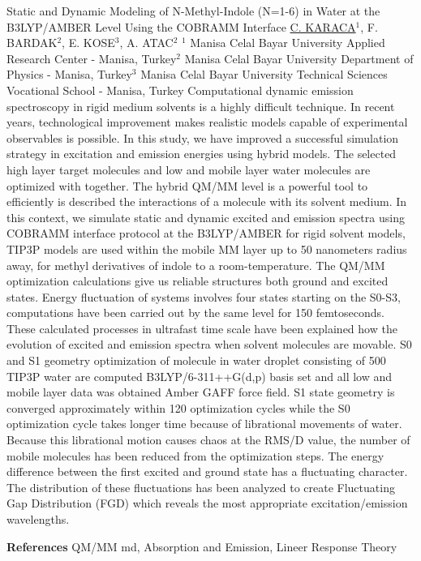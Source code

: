 
    \begin{abstract_online}{Static and Dynamic Modeling of N-Methyl-Indole (N=1-6) in Water at the B3LYP/AMBER Level Using the COBRAMM Interface}{%
        \underline{C. KARACA}$^{1}$, F. BARDAK$^{2}$, E. KOSE$^{3}$, A. ATAC$^{2}$}{%
        }{%
        $^1$ Manisa Celal Bayar University Applied Research Center - Manisa, Turkey\newline{}$^2$ Manisa Celal Bayar University Department of Physics - Manisa, Turkey\newline{}$^3$ Manisa Celal Bayar University Technical Sciences Vocational School - Manisa, Turkey}
    Computational dynamic emission spectroscopy in rigid medium solvents is a highly difficult technique. In recent years, technological improvement makes realistic models capable of experimental observables is possible. In this study, we have improved a successful simulation strategy in excitation and emission energies using hybrid models. The selected high layer target molecules and low and mobile layer water molecules are optimized with together. The hybrid QM/MM level is a powerful tool to efficiently is described the interactions of a molecule with its solvent medium. In this context, we simulate static and dynamic excited and emission spectra using COBRAMM interface protocol at the B3LYP/AMBER for rigid solvent models, TIP3P models are used within the mobile MM layer up to 50 nanometers radius away, for methyl derivatives of indole to a room-temperature. The QM/MM optimization calculations give us reliable structures both ground and excited states. Energy fluctuation of systems involves four states starting on the S0-S3, computations have been carried out by the same level for 150 femtoseconds. These calculated processes in ultrafast time scale have been explained how the evolution of excited and emission spectra when solvent molecules are movable. S0 and S1 geometry optimization of molecule in water droplet consisting of 500 TIP3P water are computed B3LYP/6-311++G(d,p) basis set and all low and mobile layer data was obtained Amber GAFF force field. S1 state geometry is converged approximately within 120 optimization cycles while the S0 optimization cycle takes longer time because of librational movements of water. Because this librational motion causes chaos at the RMS/D value, the number of mobile molecules has been reduced from the optimization steps. The energy difference between the first excited and ground state has a fluctuating character. The distribution of these fluctuations has been analyzed to create Fluctuating Gap Distribution (FGD) which reveals the most appropriate excitation/emission wavelengths. 
    
        \textbf{References} \newline{}QM/MM md, Absorption and Emission, Lineer Response Theory
    \end{abstract_online}
    